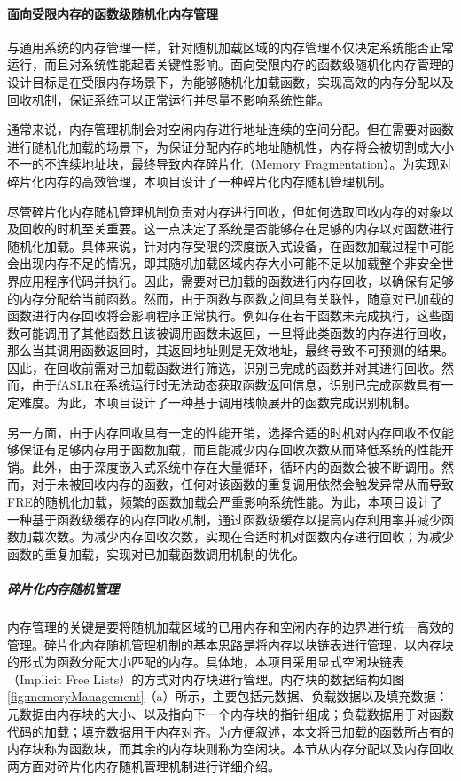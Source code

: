 \documentclass[12pt,a4paper]{ctexart}
\numberwithin{figure}{section}
\begin{document}
\paragraph{面向受限内存的函数级随机化内存管理}
\par 与通用系统的内存管理一样，针对随机加载区域的内存管理不仅决定系统能否正常运行，而且对系统性能起着关键性影响。面向受限内存的函数级随机化内存管理的设计目标是在受限内存场景下，为能够随机化加载函数，实现高效的内存分配以及回收机制，保证系统可以正常运行并尽量不影响系统性能。
\par 通常来说，内存管理机制会对空闲内存进行地址连续的空间分配。但在需要对函数进行随机化加载的场景下，为保证分配内存的地址随机性，内存将会被切割成大小不一的不连续地址块，最终导致内存碎片化（Memory Fragmentation）。为实现对碎片化内存的高效管理，本项目设计了一种碎片化内存随机管理机制。
\par 尽管碎片化内存随机管理机制负责对内存进行回收，但如何选取回收内存的对象以及回收的时机至关重要。这一点决定了系统是否能够存在足够的内存以对函数进行随机化加载。具体来说，针对内存受限的深度嵌入式设备，在函数加载过程中可能会出现内存不足的情况，即其随机加载区域内存大小可能不足以加载整个非安全世界应用程序代码并执行。因此，需要对已加载的函数进行内存回收，以确保有足够的内存分配给当前函数。然而，由于函数与函数之间具有关联性，随意对已加载的函数进行内存回收将会影响程序正常执行。例如存在若干函数未完成执行，这些函数可能调用了其他函数且该被调用函数未返回，一旦将此类函数的内存进行回收，那么当其调用函数返回时，其返回地址则是无效地址，最终导致不可预测的结果。因此，在回收前需对已加载函数进行筛选，识别已完成的函数并对其进行回收。然而，由于fASLR在系统运行时无法动态获取函数返回信息，识别已完成函数具有一定难度。为此，本项目设计了一种基于调用栈帧展开的函数完成识别机制。
\par 另一方面，由于内存回收具有一定的性能开销，选择合适的时机对内存回收不仅能够保证有足够内存用于函数加载，而且能减少内存回收次数从而降低系统的性能开销。此外，由于深度嵌入式系统中存在大量循环，循环内的函数会被不断调用。然而，对于未被回收内存的函数，任何对该函数的重复调用依然会触发异常从而导致FRE的随机化加载，频繁的函数加载会严重影响系统性能。为此，本项目设计了一种基于函数级缓存的内存回收机制，通过函数级缓存以提高内存利用率并减少函数加载次数。为减少内存回收次数，实现在合适时机对函数内存进行回收；为减少函数的重复加载，实现对已加载函数调用机制的优化。
\subparagraph{碎片化内存随机管理}
\par 内存管理的关键是要将随机加载区域的已用内存和空闲内存的边界进行统一高效的管理。碎片化内存随机管理机制的基本思路是将内存以块链表进行管理，以内存块的形式为函数分配大小匹配的内存。具体地，本项目采用显式空闲块链表（Implicit Free Lists）的方式对内存块进行管理。内存块的数据结构如图\ref{fig:memoryManagement}（a）所示，主要包括元数据、负载数据以及填充数据：元数据由内存块的大小、以及指向下一个内存块的指针组成；负载数据用于对函数代码的加载；填充数据用于内存对齐。为方便叙述，本文将已加载的函数所占有的内存块称为函数块，而其余的内存块则称为空闲块。本节从内存分配以及内存回收两方面对碎片化内存随机管理机制进行详细介绍。
\end{document}
